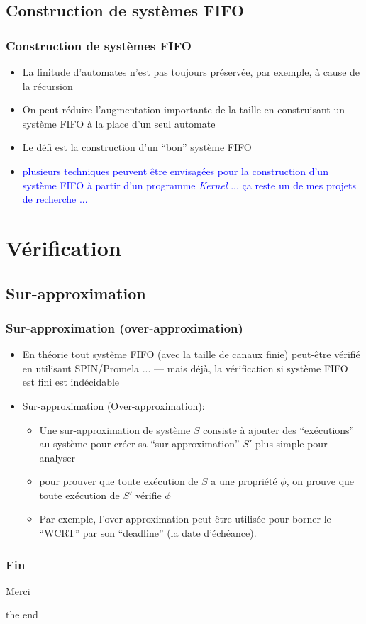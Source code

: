\documentclass{beamer}
\newcommand{\mypause}{\pause}
\newcommand{\Kernel}{\textit{Kernel}}
\begin{document}
\subsection{Construction de  systèmes FIFO}
\begin{frame}
  \frametitle{Construction de systèmes FIFO}
  \begin{itemize}
  \item La finitude d'automates n'est pas toujours préservée, par
    exemple, à cause de la récursion \mypause
  \item On peut réduire l'augmentation importante de la taille en
    construisant un système FIFO à la place d'un seul automate
    \mypause
   \item Le défi est la construction d'un ``bon'' système  FIFO
     \mypause
     \vfill
   \item[] \textcolor{blue}{plusieurs techniques peuvent être
       envisagées pour la construction d'un système FIFO à partir d'un
       programme \Kernel{} ... ça reste un de mes projets de recherche
       ... }
  \end{itemize}

\end{frame}


\section{Vérification}
\subsection{Sur-approximation}
\begin{frame}
  \frametitle{Sur-approximation (over-approximation)}
  \begin{itemize}
  \item En théorie tout système FIFO (avec la taille de canaux finie)
    peut-être vérifié en utilisant SPIN/Promela ... \mypause --- mais
    déjà, la vérification si système FIFO est fini est indécidable
    \mypause
  \item Sur-approximation (Over-approximation):
    \begin{itemize}
    \item Une sur-approximation de système $S$ consiste à ajouter des
      ``exécutions'' au système pour créer sa ``sur-approximation''
      $S'$ plus simple pour analyser \mypause
    \item pour prouver que toute exécution de $S$ a une propriété
      $\phi$, on prouve que toute exécution de $S'$ vérifie $\phi$ \mypause
    \item Par exemple, l'over-approximation peut être utilisée pour
      borner le ``WCRT'' par son ``deadline'' (la date d'échéance).
    \end{itemize}
  \end{itemize}

\end{frame}



\begin{frame}
\frametitle{Fin}

Merci \mypause
\end{frame}
the end 
\end{document}
